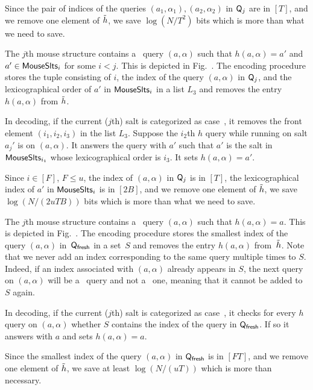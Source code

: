   Since the pair of indices of the queries $(a_1,\alpha_1),(a_2,\alpha_2)$ in $\mathsf{Q}_j$ are in $[T]$, and we remove one element of $\tilde{h}$, we save $\log (N/T^2)$ bits which is more than what we need to save.

The $j$th mouse structure contains a \new\ query $(a,\alpha)$ such that $h(a,\alpha)=a'$ and $a'\in \mathsf{MouseSlts}_i$ for some $i<j$. This is depicted in Fig.~. The encoding procedure stores the tuple consisting of $i$, the index of the query $(a,\alpha)$ in $\mathsf{Q}_j$, and the lexicographical order of $a'$ in $\mathsf{MouseSlts}_i$ in a list $L_3$ and removes the entry $h(a,\alpha)$ from $\tilde{h}$.

In decoding, if the current ($j$th) salt is categorized as case~, it removes the front element $(i_1,i_2,i_3)$ in the list $L_3$. Suppose the $i_2$th $h$ query while running on salt $a_j'$ is on $(a,\alpha)$. It answers the query with $a'$ such that $a'$ is the salt in $\mathsf{MouseSlts}_{i_1}$ whose lexicographical order is $i_3$. It sets $h(a,\alpha)=a'$. 



  Since $i\in [F]$, $F\le u$, the index of $(a,\alpha)$ in $\mathsf{Q}_j$ is in $[T]$, the lexicographical index of $a'$ in $\mathsf{MouseSlts}_i$ is in $[2B]$, and we remove one element of $\tilde{h}$, we save $\log (N/(2uTB))$ bits which is more than what we need to save.


The $j$th mouse structure contains a \urep\ query $(a,\alpha)$ such that $h(a,\alpha)=a$. This is depicted in Fig.~. The encoding procedure stores the smallest index of the query $(a,\alpha)$ in~$\mathsf{Q}_\textsf{fresh}$ in a set~$S$ and removes the entry $h(a,\alpha)$ from~$\tilde{h}$.   Note that we never add an index corresponding to the same query multiple times to $S$. Indeed, if an index associated with $(a,\alpha)$ already appears in $S$, the next query on $(a,\alpha)$ will be a \frep\ query and not a \urep\ one, meaning that it cannot be added to $S$ again. 

In decoding, if the current ($j$th) salt is categorized as case~, it  checks for every $h$ query on $(a,\alpha)$ whether   $S$ contains the index of the query in $\mathsf{Q}_\textsf{fresh}$. If so it answers with $a$ and sets $h(a,\alpha)=a$.


  Since the smallest index of the query $(a,\alpha)$ in $\mathsf{Q}_\textsf{fresh}$ is in $[FT]$, and we remove one element of $\tilde{h}$, we save at least $\log (N/(uT))$ which is more than necessary.

